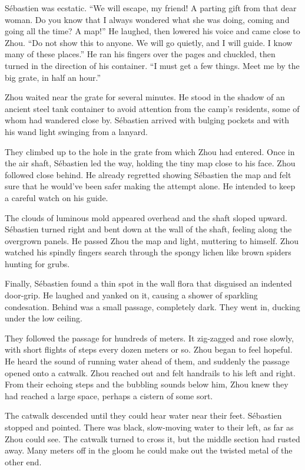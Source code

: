 \documentclass[10pt,a4paper]{article}
\begin{document}
S\'{e}bastien was ecstatic. ``We will escape, my friend! A parting
gift from that dear woman. Do you know that I always wondered what
she was doing, coming and going all the time? A map!'' He laughed,
then lowered his voice and came close to Zhou. ``Do not show this
to anyone. We will go quietly, and I will guide. I know many of
these places.'' He ran his fingers over the pages and chuckled,
then turned in the direction of his container. ``I must get a few
things. Meet me by the big grate, in half an hour.''

\bigskip

Zhou waited near the grate for several minutes. He stood in the
shadow of an ancient steel tank container to avoid attention
from the camp's residents, some of whom had wandered close by.
S\'{e}bastien arrived with bulging pockets and with his wand light
swinging from a lanyard.

They climbed up to the hole in the grate from which Zhou had
entered. Once in the air shaft, S\'{e}bastien led the way, holding the
tiny map close to his face. Zhou followed close behind. He already
regretted showing S\'{e}bastien the map and felt sure that he would've
been safer making the attempt alone. He intended to keep a careful
watch on his guide.

The clouds of luminous mold appeared overhead and the shaft sloped
upward. S\'{e}bastien turned right and bent down at the wall of the
shaft, feeling along the overgrown panels. He passed Zhou the map and
light, muttering to himself. Zhou watched his spindly fingers search
through the spongy lichen like brown spiders hunting for grubs.

Finally, S\'{e}bastien found a thin spot in the wall flora that disguised
an indented door-grip. He laughed and yanked on it, causing a shower
of sparkling condesation. Behind was a small passage, completely
dark. They went in, ducking under the low ceiling.

They followed the passage for hundreds of meters. It zig-zagged
and rose slowly, with short flights of steps every dozen meters or
so. Zhou began to feel hopeful. He heard the sound of running water
ahead of them, and suddenly the passage opened onto a catwalk. Zhou
reached out and felt handrails to his left and right. From their
echoing steps and the bubbling sounds below him, Zhou knew they
had reached a large space, perhaps a cistern of some sort.

The catwalk descended until they could hear water near their feet.
S\'{e}bastien stopped and pointed. There was black, slow-moving water to
their left, as far as Zhou could see. The catwalk turned to cross
it, but the middle section had rusted away. Many meters off in the
gloom he could make out the twisted metal of the other end.
\end{document}
